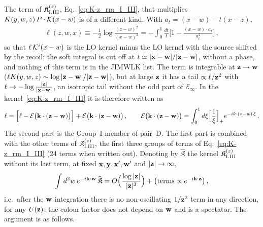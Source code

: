 The term of $\mathfrak K^{(z)}_{\rm I.III}$, Eq.~\eqref{eq:K-z_rm_I_III}, that multiplies $K(y,w,z)\,P\cdot\mathcal{K}(x-w)$ is of a different kind. With $a_t=(x-w)-t(x-z)$,
\begin{align}\label{eq:ell}
\ell(z,w,x)\equiv-\frac12\log\frac{(z-w)^2}{(x-w)^2}=-\int_0^1\frac{dt}{t}\Big[1-\frac{(x-w)\cdot a_t}{a_t^2}\Big]\,,
\end{align}
so that $\ell\,\mathcal{K}^i(x-w)$ is the LO kernel minus the LO kernel with the source shifted by the recoil; the soft integral is cut off at $t\simeq|\mathbf{x}-\mathbf{w}|/|\mathbf{z}-\mathbf{w}|$, without a phase, and nothing of this term is in the JIMWLK list. The term is integrable at $\mathbf{z}\to\mathbf{w}$ ($\ell K(y,w,z)\sim\log|\mathbf{z}-\mathbf{w}|/|\mathbf{z}-\mathbf{w}|$), but at large $\mathbf{z}$ it has a tail $\propto\ell/\mathbf{z}^2$ with $\ell\to-\log\frac{|\mathbf{z}|}{|\mathbf{x}-\mathbf{w}|}$, an isotropic tail without the odd part of $\mathcal E_\infty$. In the kernel~\eqref{eq:K-z_rm_I_III} it is therefore written as
\begin{align}
\ell=\Big[\ell-\mathcal E\big(\mathbf{k}\cdot(\mathbf{z}-\mathbf{w})\big)\Big]+\mathcal E\big(\mathbf{k}\cdot(\mathbf{z}-\mathbf{w})\big)\,,\qquad
\mathcal E\big(\mathbf{k}\cdot(\mathbf{z}-\mathbf{w})\big)=\int_0^1d\xi\Big[\frac1\xi\Big]_+e^{-ik\cdot(z-w)\,\xi}\,.
\end{align}
The second part is the Group~I member of pair~D. The first part is combined with the other terms of $\mathfrak K^{(z)}_{\rm I.III}$, the first three groups of terms of Eq.~\eqref{eq:K-z_rm_I_III} (24 terms when written out). Denoting by $\widehat{\mathfrak K}$ the kernel $\mathfrak K^{(z)}_{\rm I.III}$ without its last term, at fixed $\mathbf{x},\mathbf{y},\mathbf{x}',\mathbf{w}'$ and $|\mathbf{z}|\to\infty$,
\begin{align}\label{eq:Mhatclaim}
\int d^2w\,e^{-i\mathbf{k}\cdot\mathbf{w}}\,\widehat{\mathfrak K}=O\Big(\frac{\log|\mathbf{z}|}{|\mathbf{z}|^3}\Big)+\big(\text{terms}\propto e^{-i\mathbf{k}\cdot\mathbf{z}}\big)\,,
\end{align}
i.e.\ after the $\mathbf{w}$ integration there is no non-oscillating $1/\mathbf{z}^2$ term in any direction, for any $U(\mathbf{z})$: the colour factor does not depend on $\mathbf{w}$ and is a spectator. The argument is as follows.
